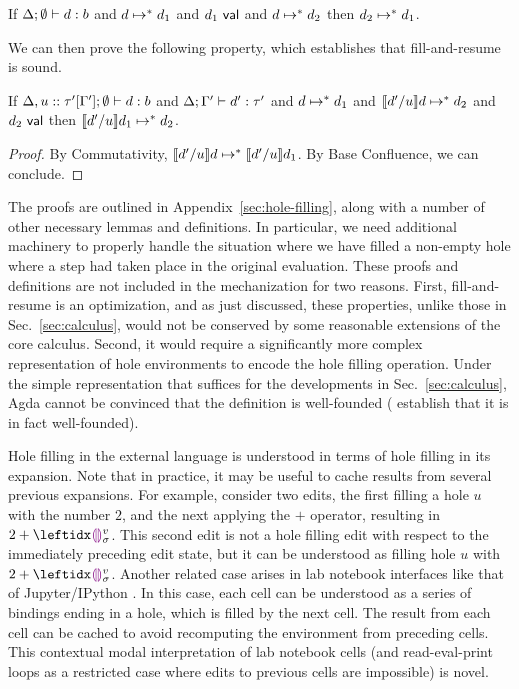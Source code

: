 \begin{lem}
  If $\Delta; \emptyset \vdash d : b$ and 
  $d \mapsto^* d_1$
  and $d_1~\mathsf{val}$
  and $d \mapsto^* d_2$
  then $d_2 \mapsto^* d_1$.
\end{lem}
We can then prove the following property, which establishes that fill-and-resume is sound.
\begin{thm}[Resumption]
  If $\Delta, u :: \tau'[\Gamma']; \emptyset \vdash d : b$
  and $\Delta; \Gamma' \vdash d' : \tau'$ 
  and $d \mapsto^* d_1$
  and $\llbracket d' / u\rrbracket d \mapsto^* d_2$
  and $d_2~\mathsf{val}$
  then $\llbracket d' / u\rrbracket d_1 \mapsto^* d_2$.
  \begin{proof}
    By Commutativity,
    $\llbracket d' / u\rrbracket d \mapsto^* \llbracket d' / u\rrbracket d_1$.
    By Base Confluence, we can conclude.
  \end{proof}
\end{thm}

The proofs are outlined in Appendix~\ref{sec:hole-filling}, along with a number of other necessary lemmas and definitions. In particular, we need additional machinery to properly handle the situation where we have filled a non-empty hole where a step had taken place in the original evaluation. These proofs and definitions are not included in the mechanization for two reasons. First, fill-and-resume is an optimization, and as just discussed, these properties, unlike those in Sec.~\ref{sec:calculus}, would not be conserved by some reasonable extensions of the core calculus. Second, it would require a significantly more complex representation of hole environments to encode the hole filling operation. Under the simple representation that suffices for the developments in Sec.~\ref{sec:calculus}, Agda cannot be convinced that the definition is well-founded (\citet{Nanevski2008} establish that it is in fact well-founded).

Hole filling in the external language is understood in terms of hole filling in its expansion. Note that in practice, it may be useful to cache results from several previous expansions. For example, consider two edits, the first filling a hole $u$ with the number $2$, and the next applying the $+$ operator, resulting in $2 + \dehole{v}{\sigma}{}$. This second edit is not a hole filling edit with respect to the immediately preceding edit state, but it can be understood as filling hole $u$ with $2 + \dehole{v}{\sigma}{}$. Another related case arises in lab notebook interfaces like that of Jupyter/IPython \cite{PER-GRA:2007}. In this case, each cell can be understood as a series of  bindings ending in a hole, which is filled by the next cell. The result from each cell can be cached to avoid recomputing the environment from preceding cells. This contextual modal interpretation of lab notebook cells (and read-eval-print loops as a restricted case where edits to previous cells are impossible) is novel.

